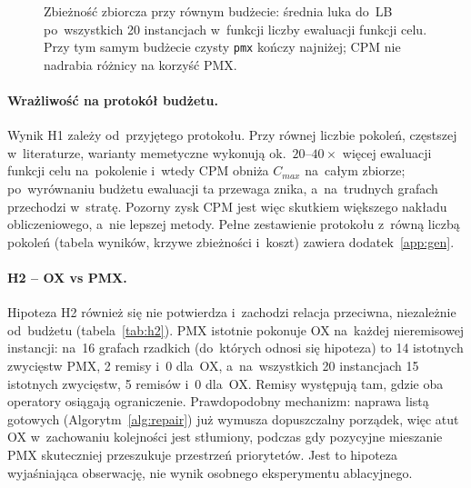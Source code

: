 \documentclass[pdflatex,sn-mathphys,Numbered]{sn-jnl}
\begin{document}
\begin{figure}[H]
\centering

\caption{Zbieżność zbiorcza przy równym budżecie: średnia luka do~LB po~wszystkich
20 instancjach w~funkcji liczby ewaluacji funkcji celu. Przy tym samym budżecie
czysty \texttt{pmx} kończy najniżej; CPM nie nadrabia różnicy na korzyść PMX.}
\label{fig:convevals}
\end{figure}

\paragraph{Wrażliwość na protokół budżetu.}
Wynik H1 zależy od~przyjętego protokołu. Przy równej liczbie pokoleń, częstszej
w~literaturze, warianty memetyczne wykonują ok.~$20$--$40\times$ więcej ewaluacji
funkcji celu na~pokolenie i~wtedy CPM obniża $C_{max}$ na~całym zbiorze; po~wyrównaniu
budżetu ewaluacji ta przewaga znika, a~na~trudnych grafach przechodzi w~stratę.
Pozorny zysk CPM jest więc skutkiem większego nakładu obliczeniowego, a~nie lepszej
metody. Pełne zestawienie protokołu z~równą liczbą pokoleń (tabela wyników, krzywe
zbieżności i~koszt) zawiera dodatek~\ref{app:gen}.

\paragraph{H2 -- OX vs PMX.}
Hipoteza H2 również się nie potwierdza i~zachodzi relacja przeciwna, niezależnie
od~budżetu (tabela~\ref{tab:h2}). PMX istotnie pokonuje OX na~każdej nieremisowej
instancji: na~16 grafach rzadkich (do~których odnosi się hipoteza) to 14
istotnych zwycięstw PMX, 2 remisy i~0 dla~OX, a~na~wszystkich 20 instancjach 15
istotnych zwycięstw, 5 remisów i~0 dla~OX. Remisy występują tam, gdzie oba operatory
osiągają ograniczenie. Prawdopodobny mechanizm: naprawa listą gotowych
(Algorytm~\ref{alg:repair}) już wymusza dopuszczalny porządek, więc atut OX
w~zachowaniu kolejności jest stłumiony, podczas gdy pozycyjne mieszanie PMX
skuteczniej przeszukuje przestrzeń priorytetów. Jest to hipoteza wyjaśniająca
obserwację, nie wynik osobnego eksperymentu ablacyjnego.
\end{document}
